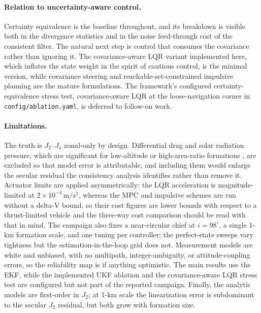 \paragraph{Relation to uncertainty-aware control.}
Certainty equivalence is the baseline throughout, and its breakdown is
visible both in the divergence statistics and in the noise feed-through cost
of the consistent filter. The natural next step is control that consumes the
covariance rather than ignoring it. The covariance-aware LQR variant
implemented here, which inflates the state weight in the spirit of cautious
control, is the minimal version, while covariance steering
\cite{ridderhof2021covariance} and reachable-set-constrained impulsive
planning \cite{chernick2021reachable,hunter2025cislunar} are the mature
formulations. The framework's configured certainty-equivalence stress test,
covariance-aware LQR at the loose-navigation corner in
\texttt{config/ablation.yaml}, is deferred to follow-on work.

\paragraph{Limitations.}
The truth is $J_2$--$J_4$ zonal-only by design. Differential drag and solar
radiation pressure, which are significant for low-altitude or
high-area-ratio formations \cite{gaias2015drag,guffanti2019srp}, are
excluded so that model error is attributable, and including them would
enlarge the secular residual the consistency analysis identifies rather than
remove it. Actuator limits are applied asymmetrically: the LQR acceleration
is magnitude-limited at $2\times10^{-4}\,\mathrm{m/s^2}$, whereas the MPC
and impulsive schemes are run without a delta-V bound, so their cost figures
are lower bounds with respect to a thrust-limited vehicle and the three-way
cost comparison should be read with that in mind. The campaign also fixes a
near-circular chief at $i = 98^\circ$, a single 1-km formation scale, and
one tuning per controller; the perfect-state sweeps vary tightness but the
estimation-in-the-loop grid does not. Measurement models are white and
unbiased, with no multipath, integer-ambiguity, or attitude-coupling errors,
so the reliability map is if anything optimistic. The main results use the
EKF, while the implemented UKF ablation and the covariance-aware LQR stress
test are configured but not part of the reported campaign. Finally, the
analytic models are first-order in $J_2$; at 1-km scale the linearization
error is subdominant to the secular $J_2$ residual, but both grow with
formation size.
